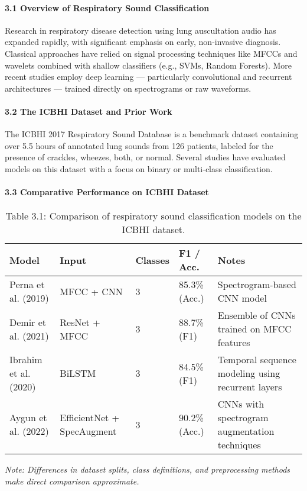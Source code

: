 \paragraph{3.1 Overview of Respiratory Sound Classification\\}
Research in respiratory disease detection using lung auscultation audio has expanded rapidly, with significant emphasis on early, non-invasive diagnosis. Classical approaches have relied on signal processing techniques like MFCCs and wavelets combined with shallow classifiers (e.g., SVMs, Random Forests). More recent studies employ deep learning — particularly convolutional and recurrent architectures — trained directly on spectrograms or raw waveforms.
\paragraph{3.2 The ICBHI Dataset and Prior Work\\}
The ICBHI 2017 Respiratory Sound Database is a benchmark dataset containing over 5.5 hours of annotated lung sounds from 126 patients, labeled for the presence of crackles, wheezes, both, or normal. Several studies have evaluated models on this dataset with a focus on binary or multi-class classification.
\paragraph{3.3 Comparative Performance on ICBHI Dataset\\}
\begin{table}[h!]
\centering
\small
\renewcommand{\arraystretch}{1.2}
\begin{tabular}{|p{3.2cm}|p{2.2cm}|p{1.5cm}|p{2.2cm}|p{4cm}|}
\hline
\textbf{Model} & \textbf{Input} & \textbf{Classes} & \textbf{F1 / Acc.} & \textbf{Notes} \\
\hline
Perna et al. (2019) & MFCC + CNN & 3 & 85.3\% (Acc.) & Spectrogram-based CNN model \\
Demir et al. (2021) & ResNet + MFCC & 3 & 88.7\% (F1) & Ensemble of CNNs trained on MFCC features \\
Ibrahim et al. (2020) & BiLSTM & 3 & 84.5\% (F1) & Temporal sequence modeling using recurrent layers \\
Aygun et al. (2022) & EfficientNet + SpecAugment & 3 & 90.2\% (Acc.) & CNNs with spectrogram augmentation techniques \\
\hline
\end{tabular}
\caption*{Table 3.1: Comparison of respiratory sound classification models on the ICBHI dataset.}
\label{tab:icbhi_comparison}
\end{table}
\vspace{0.5em}
\textit{Note: Differences in dataset splits, class definitions, and preprocessing methods make direct comparison approximate.}
